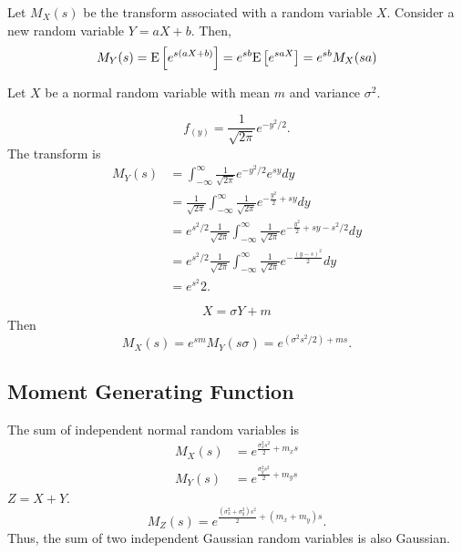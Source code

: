 \newpage

\begin{example}
Let $M_X(s)$ be the transform associated with a random variable $X$.
Consider a new random variable $Y = aX + b$.
Then,
\begin{equation*}
M_Y(s) = \mathrm{E} \left[ e^{s(aX + b)} \right]
= e^{sb} \mathrm{E} \left[ e^{saX} \right]
= e^{sb} M_X (sa)
\end{equation*}
\end{example}

\begin{example}
Let $X$ be a normal random variable with mean $m$ and variance $\sigma^2$.

\begin{equation*}
f_(y) = \frac{1}{\sqrt{2 \pi}} e^{- y^2 /2}.
\end{equation*}
The transform is
\begin{equation*}
\begin{split}
M_Y (s)
&= \int_{- \infty}^{\infty} \frac{1}{\sqrt{2 \pi}} e^{- y^2 / 2} e^{sy} dy \\
&= \frac{1}{\sqrt{2 \pi}}
\int_{- \infty}^{\infty} \frac{1}{\sqrt{2 \pi}} e^{- \frac{y^2}{2} + sy} dy \\
&= e^{s^2/2} \frac{1}{\sqrt{2 \pi}}
\int_{- \infty}^{\infty} \frac{1}{\sqrt{2 \pi}} e^{- \frac{y^2}{2} + sy - s^2/2} dy \\
&= e^{s^2/2} \frac{1}{\sqrt{2 \pi}}
\int_{- \infty}^{\infty} \frac{1}{\sqrt{2 \pi}} e^{- \frac{(y - s)^2}{2}} dy \\
&= e^{s^2}{2} .
\end{split}
\end{equation*}

\begin{equation*}
X = \sigma Y + m
\end{equation*}
Then
\begin{equation*}
M_X (s) = e^{sm} M_Y (s \sigma) = e^{(\sigma^2 s^2 / 2) + m s}.
\end{equation*}
\end{example}

\subsection{Moment Generating Function}





\begin{example}
The sum of independent normal random variables is
\begin{align*}
M_X (s) &= e^{\frac{\sigma_x^2 s^2}{2} + m_x s} \\
M_Y (s) &= e^{\frac{\sigma_y^2 s^2}{2} + m_y s}
\end{align*}
$Z = X + Y$.
\begin{equation*}
M_Z (s) = e^{\frac{(\sigma_x^2 + \sigma_y^2) s^2}{2} + (m_x + m_y) s} .
\end{equation*}
Thus, the sum of two independent Gaussian random variables is also Gaussian.
\end{example}


